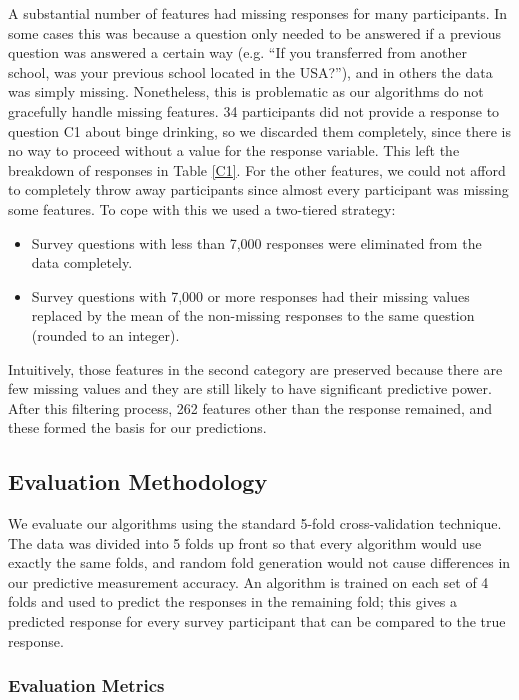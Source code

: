A substantial number of features had missing responses for many participants.  In some cases this was because a question only needed to be answered if a previous question was answered a certain way (e.g. ``If you transferred from another school, was your previous school located in the USA?''), and in others the data was simply missing.  Nonetheless, this is problematic as our algorithms do not gracefully handle missing features.  34 participants did not provide a response to question C1 about binge drinking, so we discarded them completely, since there is no way to proceed without a value for the response variable.  This left the breakdown of responses in Table \ref{C1}.  For the other features, we could not afford to completely throw away participants since almost every participant was missing some features.  To cope with this we used a two-tiered strategy:

\begin{itemize}
\item Survey questions with less than 7,000 responses were eliminated from the data completely.
\item Survey questions with 7,000 or more responses had their missing values replaced by the mean of the non-missing responses to the same question (rounded to an integer).
\end{itemize}

Intuitively, those features in the second category are preserved because there are few missing values and they are still likely to have significant predictive power.  After this filtering process, 262 features other than the response remained, and these formed the basis for our predictions.

\subsection{Evaluation Methodology}

We evaluate our algorithms using the standard 5-fold cross-validation technique.  The data was divided into 5 folds up front so that every algorithm would use exactly the same folds, and random fold generation would not cause differences in our predictive measurement accuracy.  An algorithm is trained on each set of 4 folds and used to predict the responses in the remaining fold; this gives a predicted response for every survey participant that can be compared to the true response.

\subsubsection{Evaluation Metrics}

